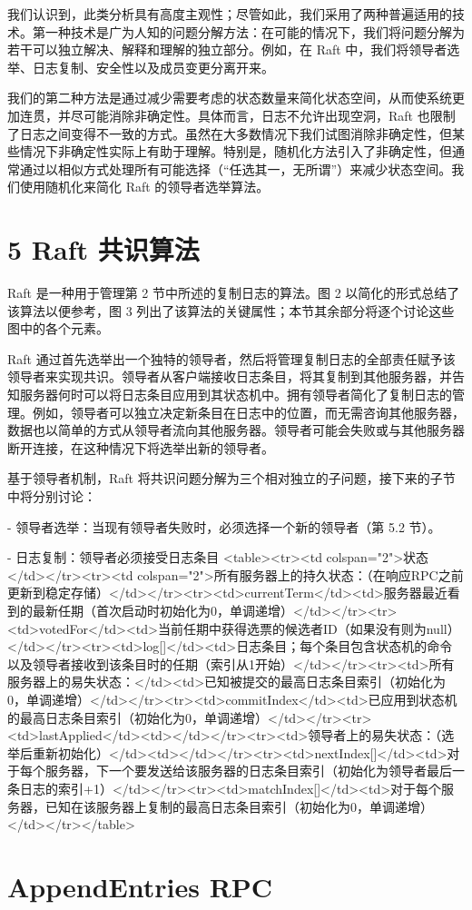 \documentclass[12pt,a4paper]{report} %
\begin{document}
我们认识到，此类分析具有高度主观性；尽管如此，我们采用了两种普遍适用的技术。第一种技术是广为人知的问题分解方法：在可能的情况下，我们将问题分解为若干可以独立解决、解释和理解的独立部分。例如，在 Raft 中，我们将领导者选举、日志复制、安全性以及成员变更分离开来。

我们的第二种方法是通过减少需要考虑的状态数量来简化状态空间，从而使系统更加连贯，并尽可能消除非确定性。具体而言，日志不允许出现空洞，Raft 也限制了日志之间变得不一致的方式。虽然在大多数情况下我们试图消除非确定性，但某些情况下非确定性实际上有助于理解。特别是，随机化方法引入了非确定性，但通常通过以相似方式处理所有可能选择（“任选其一，无所谓”）来减少状态空间。我们使用随机化来简化 Raft 的领导者选举算法。

\section*{5 Raft 共识算法}

Raft 是一种用于管理第 2 节中所述的复制日志的算法。图 2 以简化的形式总结了该算法以便参考，图 3 列出了该算法的关键属性；本节其余部分将逐个讨论这些图中的各个元素。

Raft 通过首先选举出一个独特的领导者，然后将管理复制日志的全部责任赋予该领导者来实现共识。领导者从客户端接收日志条目，将其复制到其他服务器，并告知服务器何时可以将日志条目应用到其状态机中。拥有领导者简化了复制日志的管理。例如，领导者可以独立决定新条目在日志中的位置，而无需咨询其他服务器，数据也以简单的方式从领导者流向其他服务器。领导者可能会失败或与其他服务器断开连接，在这种情况下将选举出新的领导者。

基于领导者机制，Raft 将共识问题分解为三个相对独立的子问题，接下来的子节中将分别讨论：

- 领导者选举：当现有领导者失败时，必须选择一个新的领导者（第 5.2 节）。

- 日志复制：领导者必须接受日志条目
<table><tr><td colspan="2">状态</td></tr><tr><td colspan="2">所有服务器上的持久状态：（在响应RPC之前更新到稳定存储）</td></tr><tr><td>currentTerm</td><td>服务器最近看到的最新任期（首次启动时初始化为0，单调递增）</td></tr><tr><td>votedFor</td><td>当前任期中获得选票的候选者ID（如果没有则为null）</td></tr><tr><td>log[]</td><td>日志条目；每个条目包含状态机的命令以及领导者接收到该条目时的任期（索引从1开始）</td></tr><tr><td>所有服务器上的易失状态：</td><td>已知被提交的最高日志条目索引（初始化为0，单调递增）</td></tr><tr><td>commitIndex</td><td>已应用到状态机的最高日志条目索引（初始化为0，单调递增）</td></tr><tr><td>lastApplied</td><td></td></tr><tr><td>领导者上的易失状态：（选举后重新初始化）</td><td></td></tr><tr><td>nextIndex[]</td><td>对于每个服务器，下一个要发送给该服务器的日志条目索引（初始化为领导者最后一条日志的索引+1）</td></tr><tr><td>matchIndex[]</td><td>对于每个服务器，已知在该服务器上复制的最高日志条目索引（初始化为0，单调递增）</td></tr></table> \section*{AppendEntries RPC}
\end{document}
